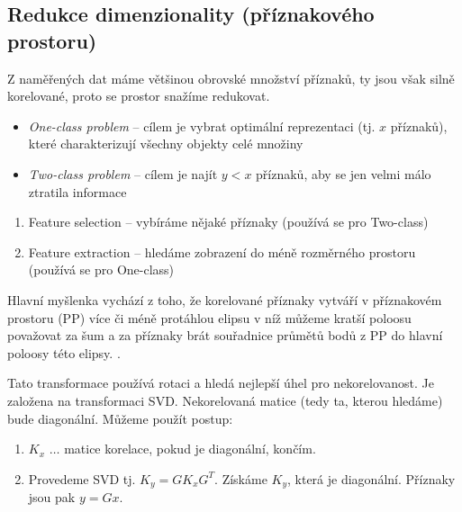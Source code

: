

\subsection{Redukce dimenzionality (příznakového prostoru)}
Z naměřených dat máme většinou obrovské množství příznaků, ty jsou však silně korelované, proto se prostor 
snažíme redukovat.

\begin{itemize}
\item {\em One-class problem} -- cílem je vybrat optimální reprezentaci (tj. $x$ příznaků), které charakterizují 
všechny objekty celé množiny
\item {\em Two-class problem} -- cílem je najít $y<x$ příznaků, aby se jen velmi málo ztratila informace
\end{itemize}

\begin{enumerate}
\item Feature selection -- vybíráme nějaké příznaky (používá se pro Two-class)
\item Feature extraction -- hledáme zobrazení do méně rozměrného prostoru (používá se pro One-class)
\end{enumerate}


Hlavní myšlenka vychází z toho, že korelované příznaky vytváří v příznakovém prostoru (PP) více či méně protáhlou
elipsu v níž můžeme kratší poloosu považovat za šum a za příznaky brát souřadnice průmětů bodů z PP do hlavní poloosy
této elipsy.
.

Tato transformace používá rotaci a hledá nejlepší úhel pro nekorelovanost. 
Je založena  na transformaci SVD. Nekorelovaná matice (tedy ta, kterou hledáme) bude diagonální. Můžeme použít postup:

\begin{enumerate}
\item $K_x$ $\dots$ matice korelace, pokud je diagonální, končím.
\item Provedeme SVD tj. $K_y=GK_xG^T$. Získáme $K_y$, která je diagonální. Příznaky jsou pak $y=Gx$.
\end{enumerate}

